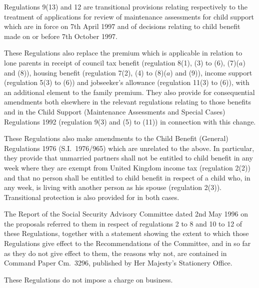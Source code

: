 \documentclass[a4paper]{article}
\begin{document}
  Regulations 9(13) and 12 are transitional provisions relating respectively to the treatment of applications for review of maintenance assessments for child support which are in force on 7th April 1997 and of decisions relating to child benefit made on or before 7th October 1997.

  These Regulations also replace the premium which is applicable in relation to lone parents in receipt of council tax benefit (regulation 8(1), (3) to (6), (7)($a$) and (8)), housing benefit (regulation 7(2), (4) to (8)($a$) and (9)), income support (regulation 5(3) to (6)) and jobseeker’s allowance (regulation 11(3) to (6)), with an additional element to the family premium. They also provide for consequential amendments both elsewhere in the relevant regulations relating to those benefits and in the Child Support (Maintenance Assessments and Special Cases) Regulations 1992 (regulation 9(3) and (5) to (11)) in connection with this change.

  These Regulations also make amendments to the Child Benefit (General) Regulations 1976 (S.I.\ 1976/965) which are unrelated to the above. In particular, they provide that unmarried partners shall not be entitled to child benefit in any week where they are exempt from United Kingdom income tax (regulation 2(2)) and that no person shall be entitled to child benefit in respect of a child who, in any week, is living with another person as his spouse (regulation 2(3)). Transitional protection is also provided for in both cases.

  The Report of the Social Security Advisory Committee dated 2nd May 1996 on the proposals referred to them in respect of regulations 2 to 8 and 10 to 12 of these Regulations, together with a statement showing the extent to which those Regulations give effect to the Recommendations of the Committee, and in so far as they do not give effect to them, the reasons why not, are contained in Command Paper Cm.\ 3296, published by Her Majesty’s Stationery Office.

  These Regulations do not impose a charge on business.
\end{document}
